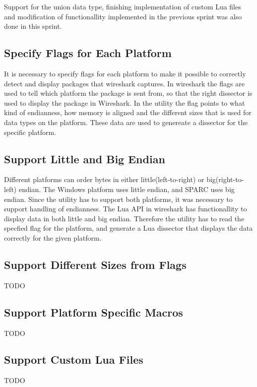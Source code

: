 Support for the union data type, finishing implementation of custom Lua files 
and modification of functionallity implemented in the previous sprint was also 
done in this sprint.

\subsection{Specify Flags for Each Platform}
It is necessary to specify flags for each platform to make it possible to 
correctly detect and display packages that wireshark captures. In wireshark 
the flags are used to tell which platform the package is sent from, so that 
the right dissector is used to display the package in Wireshark. In the 
utility the flag points to what kind of endianness, how memory is aligned and 
the different sizes that is used for data types on the platform. These data 
are used to genereate a dissector for the specific platform.

\subsection{Support Little and Big Endian}
Different platforms can order bytes in either little(left-to-right) or 
big(right-to-left) endian. The Windows platform uses little endian, and SPARC 
uses big endian. Since the utility has to support both platforms, it was 
necessary to support handling of endianness. The Lua API in wireshark has 
functionallity to display data in both little and big endian. Therefore the 
utility has to read the specfied flag for the platform, and generate a Lua 
dissector that displays the data correctly for the given platform.

\subsection{Support Different Sizes from Flags}
TODO

\subsection{Support Platform Specific Macros}
TODO

\subsection{Support Custom Lua Files}
TODO

